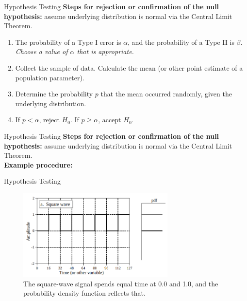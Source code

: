 \documentclass{beamer}
\begin{document}
\begin{frame}{Hypothesis Testing}
\textbf{Steps for rejection or confirmation of the null hypothesis:} assume underlying distribution is normal via the Central Limit Theorem.
\begin{enumerate}
\item The probability of a Type I error is $\alpha$, and the probability of a Type II is $\beta$.  \textit{Choose a value of $\alpha$ that is appropriate.}
\item Collect the sample of data.  Calculate the mean (or other point estimate of a population parameter).
\item Determine the probability $p$ that the mean occurred randomly, given the underlying distribution.
\item If $p < \alpha$, reject $H_0$.  If $p \geq \alpha$, accept $H_0$.
\end{enumerate}
\end{frame}

\begin{frame}{Hypothesis Testing}
\textbf{Steps for rejection or confirmation of the null hypothesis:} assume underlying distribution is normal via the Central Limit Theorem.\\ \vspace{0.5cm}
\textbf{Example procedure:} \\ \vspace{5cm}
\end{frame}

\begin{frame}[fragile]{Hypothesis Testing}
\begin{figure}
\centering
\includegraphics[width=0.7\textwidth]{figures/squarepdf.png}
\caption{\label{fig:squarepdf} The square-wave signal spends equal time at 0.0 and 1.0, and the probability density function reflects that.}
\end{figure}
\end{frame}
\end{document}
